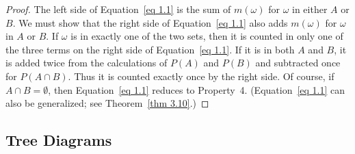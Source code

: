 \begin{proof}
\leanok
{}
The left side of Equation~\ref{eq 1.1} is the sum of $m(\omega)$ for     
$\omega$ in either $A$ or $B$.  We must show that the right side of 
Equation~\ref{eq 1.1} also adds $m(\omega)$ for $\omega$ in $A$ or $B$. 
If $\omega$ is in exactly one of the two sets, then it is counted in only one
of the three terms on the right side of Equation~\ref{eq 1.1}.                
If it is in both $A$ and $B$, it is added twice from the calculations of
$P(A)$ and $P(B)$
and subtracted once for $P(A \cap B)$.  Thus it is counted exactly once by
the right side.  Of course, if $A \cap B = \emptyset$, then Equation~\ref{eq 1.1} 
reduces to Property~4.
(Equation~\ref{eq 1.1} can also be generalized; see Theorem~\ref{thm 3.10}.)  
\end{proof}

\subsection*{Tree Diagrams}

